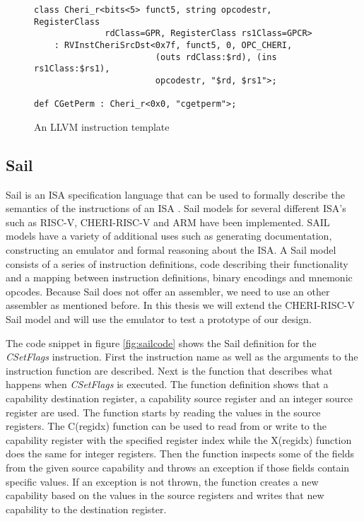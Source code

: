 \begin{figure}[h]
\begin{verbatim}
class Cheri_r<bits<5> funct5, string opcodestr, RegisterClass
              rdClass=GPR, RegisterClass rs1Class=GPCR>
    : RVInstCheriSrcDst<0x7f, funct5, 0, OPC_CHERI,
                        (outs rdClass:$rd), (ins rs1Class:$rs1),
                        opcodestr, "$rd, $rs1">;

def CGetPerm : Cheri_r<0x0, "cgetperm">;
\end{verbatim}
\caption{An LLVM instruction template}
\label{fig:insttemplate}
\end{figure}

\subsection{Sail}
Sail is an ISA specification language that can be used to formally describe the semantics of the instructions of an ISA \cite{10.1145/3290384}. Sail models for several different ISA's such as RISC-V, CHERI-RISC-V and ARM have been implemented. SAIL models have a variety of additional uses such as generating documentation, constructing an emulator and formal reasoning about the ISA.
A Sail model consists of a series of instruction definitions, code describing their functionality and a mapping between instruction definitions, binary encodings and mnemonic opcodes.
Because Sail does not offer an assembler, we need to use an other assembler as mentioned before.
In this thesis we will extend the CHERI-RISC-V Sail model and will use the emulator to test a prototype of our design.

The code snippet in figure \ref{fig:sailcode} shows the Sail definition for the \textit{CSetFlags} instruction.
First the instruction name as well as the arguments to the instruction function are described.
Next is the function that describes what happens when \textit{CSetFlags} is executed.
The function definition shows that a capability destination register, a capability source register and an integer source register are used.
The function starts by reading the values in the source registers.
The C(regidx) function can be used to read from or write to the capability register with the specified register index while the X(regidx) function does the same for integer registers.
Then the function inspects some of the fields from the given source capability and throws an exception if those fields contain specific values.
If an exception is not thrown, the function creates a new capability based on the values in the source registers and writes that new capability to the destination register.

